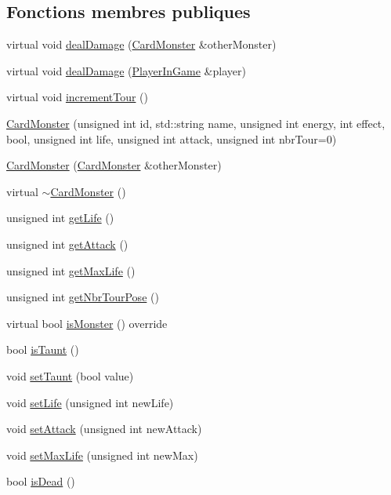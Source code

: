 \subsection*{Fonctions membres publiques}
\begin{DoxyCompactItemize}
\item 
virtual void \hyperlink{classCardMonster_aaf28396b394a9400d257eddfa09e4567}{deal\+Damage} (\hyperlink{classCardMonster}{Card\+Monster} \&other\+Monster)
\item 
virtual void \hyperlink{classCardMonster_a829d68246c3af5f136cdf2cbc11284b0}{deal\+Damage} (\hyperlink{classPlayerInGame}{Player\+In\+Game} \&player)
\item 
virtual void \hyperlink{classCardMonster_a2d55cf30d111437486e2b1bacefcbf79}{increment\+Tour} ()
\item 
\hyperlink{classCardMonster_aff315735b920acc3cd0a6b909a4a3c25}{Card\+Monster} (unsigned int id, std\+::string name, unsigned int energy, int effect, bool, unsigned int life, unsigned int attack, unsigned int nbr\+Tour=0)
\item 
\hyperlink{classCardMonster_a5f577cbecdf0d1c6a6ccbc848793ddef}{Card\+Monster} (\hyperlink{classCardMonster}{Card\+Monster} \&other\+Monster)
\item 
virtual \hyperlink{classCardMonster_a7b23269cfbfb6df2eb7f28195b0994f0}{$\sim$\+Card\+Monster} ()
\item 
unsigned int \hyperlink{classCardMonster_a31df57dbefaefdedf87d7e35f2659233}{get\+Life} ()
\item 
unsigned int \hyperlink{classCardMonster_abf8d88a45f9ff97689e9ff32510ca7ee}{get\+Attack} ()
\item 
unsigned int \hyperlink{classCardMonster_aa205178cc69a1c9573557e5ed86beb50}{get\+Max\+Life} ()
\item 
unsigned int \hyperlink{classCardMonster_ab5253a6be95255f39f494326010aa4e5}{get\+Nbr\+Tour\+Pose} ()
\item 
virtual bool \hyperlink{classCardMonster_add70449c1bc34baee852fe07cc7d39cc}{is\+Monster} () override
\item 
bool \hyperlink{classCardMonster_adcac6e14fd885a63a872ef02e3f9472b}{is\+Taunt} ()
\item 
void \hyperlink{classCardMonster_a27de130e39afaf1855e3e6b644ab83c2}{set\+Taunt} (bool value)
\item 
void \hyperlink{classCardMonster_a8aeba0819ce64bf958d9b5ae1bceb61b}{set\+Life} (unsigned int new\+Life)
\item 
void \hyperlink{classCardMonster_aa27378a04c731a5a69d191314ace4144}{set\+Attack} (unsigned int new\+Attack)
\item 
void \hyperlink{classCardMonster_ad20bc2d69ddabeea8bab358a8e02500d}{set\+Max\+Life} (unsigned int new\+Max)
\item 
bool \hyperlink{classCardMonster_a48083f1dfbc22519fbc30ecab2cadfc3}{is\+Dead} ()
\end{DoxyCompactItemize}



